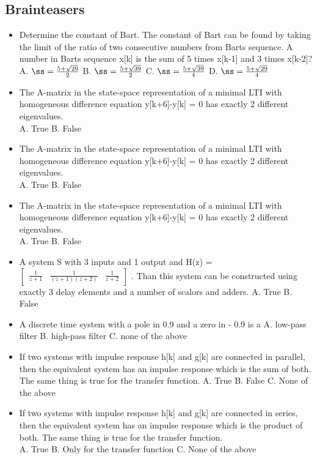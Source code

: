 \documentclass{document}
\begin{document}
		\subsection{Brainteasers}
		\begin{itemize}
			\item 	Determine the constant of Bart. The constant of Bart can be found by taking the limit of the ratio of two consecutive numbers from Barts sequence. A number in Barts sequence x[k] is the sum of 5 times x[k-1] and 3 times x[k-2]?\\
			A. $ß = {5 + \sqrt{29} \over 2}$
			B. $ß = {5 + \sqrt{39} \over 2}$
			C. $ß = {5 + \sqrt{3 9} \over 4}$
			D. $ß = {5 + \sqrt{29} \over 4}$
			\item The A-matrix in the state-space representation of a minimal LTI with homogeneous difference equation y[k+6]-y[k] = 0 has exactly 2 different eigenvalues.\\
			A. True
			B. False
			\item The A-matrix in the state-space representation of a minimal LTI with homogeneous difference equation y[k+6]-y[k] = 0 has exactly 2 different eigenvalues.\\
			A. True
			B. False
			\item The A-matrix in the state-space representation of a minimal LTI with homogeneous difference equation y[k+6]-y[k] = 0 has exactly 2 different eigenvalues.\\
			A. True
			B. False
			\item A system S with 3 inputs and 1 output and H(z) = $\begin{bmatrix} \frac{1}{z+1} & \frac{1}{(z+1)(z+2)} & \frac{1}{z+2} \end{bmatrix}$ . Than this system can be constructed using exactly 3 delay elements and a number of scalors and adders. 
			A. True
			B. False
			\item A discrete time system with a pole in 0.9 and a zero in - 0.9 is a
			A. low-pass filter
			B. high-pass filter
			C. none of the above
			\item If two systems with impulse response h[k] and g[k] are connected in parallel, then the equivalent system has an impulse response which is the sum of both. The same thing is true for the transfer function.
			A. True
			B. False
			C. None of the above
			\item If two systems with impulse response h[k] and g[k] are connected in series, then the equivalent system has an impulse response which is the product of both. The same thing is true for the transfer function.\\
			A. True
			B. Only for the transfer function
			C. None of the above
		\end{itemize}
\end{document}
